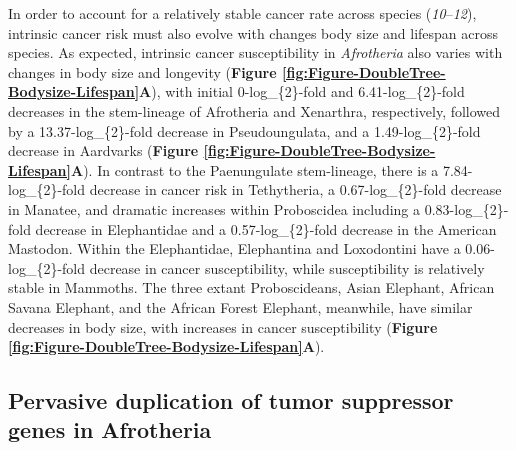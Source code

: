 \documentclass[]{elsarticle} %
\begin{document}
In order to account for a relatively stable cancer rate across species (\emph{10}--\emph{12}), intrinsic cancer risk must also evolve with changes body size and lifespan across species. As expected, intrinsic cancer susceptibility in \emph{Afrotheria} also varies with changes in body size and longevity (\textbf{Figure \ref{fig:Figure-DoubleTree-Bodysize-Lifespan}A}), with initial 0-log\_\{2\}-fold and 6.41-log\_\{2\}-fold decreases in the stem-lineage of Afrotheria and Xenarthra, respectively, followed by a 13.37-log\_\{2\}-fold decrease in Pseudoungulata, and a 1.49-log\_\{2\}-fold decrease in Aardvarks (\textbf{Figure \ref{fig:Figure-DoubleTree-Bodysize-Lifespan}A}). In contrast to the Paenungulate stem-lineage, there is a 7.84-log\_\{2\}-fold decrease in cancer risk in Tethytheria, a 0.67-log\_\{2\}-fold decrease in Manatee, and dramatic increases within Proboscidea including a 0.83-log\_\{2\}-fold decrease in Elephantidae and a 0.57-log\_\{2\}-fold decrease in the American Mastodon. Within the Elephantidae, Elephantina and Loxodontini have a 0.06-log\_\{2\}-fold decrease in cancer susceptibility, while susceptibility is relatively stable in Mammoths. The three extant Proboscideans, Asian Elephant, African Savana Elephant, and the African Forest Elephant, meanwhile, have similar decreases in body size, with increases in cancer susceptibility (\textbf{Figure \ref{fig:Figure-DoubleTree-Bodysize-Lifespan}A}).

\hypertarget{pervasive-duplication-of-tumor-suppressor-genes-in-afrotheria}{%
\subsection{Pervasive duplication of tumor suppressor genes in Afrotheria}\label{pervasive-duplication-of-tumor-suppressor-genes-in-afrotheria}}
\end{document}
